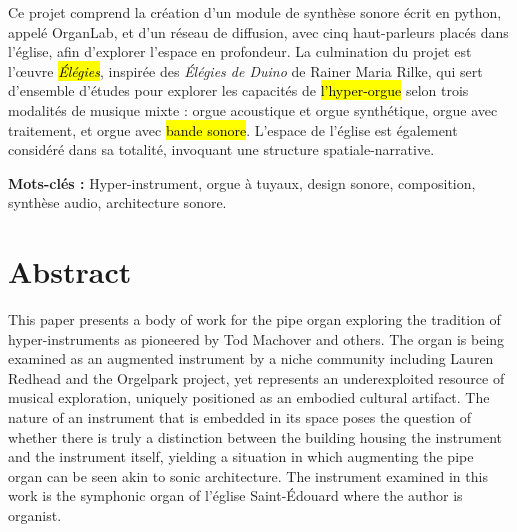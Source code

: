\documentclass[12pt,twoside,maitrise]{dms_ks}
\theoremstyle{definition}
\begin{document}
Ce projet comprend la création d'un module de synthèse sonore écrit en python, appelé OrganLab, et d'un réseau de diffusion, avec cinq haut-parleurs placés dans l'église, afin d'explorer l'espace en profondeur. 
La culmination du projet est l'œuvre \hl{\textit{Élégies}}, inspirée des \textit{Élégies de Duino} de Rainer Maria Rilke, qui sert d'ensemble d'études pour explorer les capacités de \hl{l'hyper-orgue} selon trois modalités de musique mixte : orgue acoustique et orgue synthétique, orgue avec traitement, et orgue avec \hl{bande sonore}. 
L'espace de l'église est également considéré dans sa totalité, invoquant une structure spatiale-narrative. 

\textbf{Mots-clés :} Hyper-instrument, orgue à tuyaux, design sonore, composition, synthèse audio, architecture sonore.



\anglais

\chapter*{Abstract}

This paper presents a body of work for the pipe organ exploring the tradition of hyper-instruments as pioneered by Tod Machover and others. 
The organ is being examined as an augmented instrument by a niche community including Lauren Redhead and the Orgelpark project, yet represents an underexploited resource of musical exploration, uniquely positioned as an embodied cultural artifact. 
The nature of an instrument that is embedded in its space poses the question of whether there is truly a distinction between the building housing the instrument and the instrument itself, yielding a situation in which augmenting the pipe organ can be seen akin to sonic architecture. 
The instrument examined in this work is the symphonic organ of l'église Saint-Édouard where the author is organist. 
\end{document}
